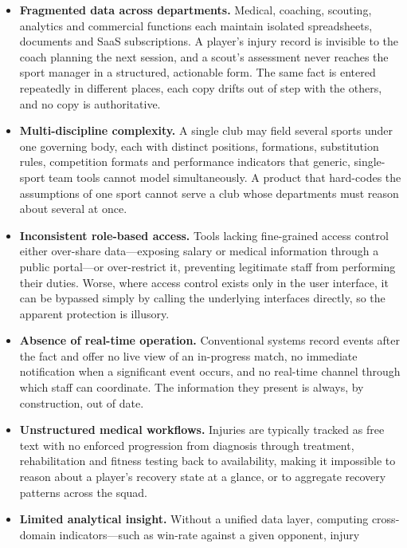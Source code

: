 \begin{itemize}
  \item \textbf{Fragmented data across departments.} Medical, coaching, scouting,
        analytics and commercial functions each maintain isolated spreadsheets, documents
        and SaaS subscriptions. A player's injury record is invisible to the coach planning
        the next session, and a scout's assessment never reaches the sport manager in a
        structured, actionable form. The same fact is entered repeatedly in different places,
        each copy drifts out of step with the others, and no copy is authoritative.
  \item \textbf{Multi-discipline complexity.} A single club may field several sports under
        one governing body, each with distinct positions, formations, substitution rules,
        competition formats and performance indicators that generic, single-sport team tools
        cannot model simultaneously. A product that hard-codes the assumptions of one
        sport cannot serve a club whose departments must reason about several at once.
  \item \textbf{Inconsistent role-based access.} Tools lacking fine-grained access
        control either over-share data---exposing salary or medical information through a
        public portal---or over-restrict it, preventing legitimate staff from performing
        their duties. Worse, where access control exists only in the user interface, it can be
        bypassed simply by calling the underlying interfaces directly, so the apparent
        protection is illusory.
  \item \textbf{Absence of real-time operation.} Conventional systems record events after
        the fact and offer no live view of an in-progress match, no immediate notification
        when a significant event occurs, and no real-time channel through which staff can
        coordinate. The information they present is always, by construction, out of date.
  \item \textbf{Unstructured medical workflows.} Injuries are typically tracked as free
        text with no enforced progression from diagnosis through treatment, rehabilitation
        and fitness testing back to availability, making it impossible to reason about a
        player's recovery state at a glance, or to aggregate recovery patterns across the
        squad.
  \item \textbf{Limited analytical insight.} Without a unified data layer, computing
        cross-domain indicators---such as win-rate against a given opponent, injury

\end{itemize}
